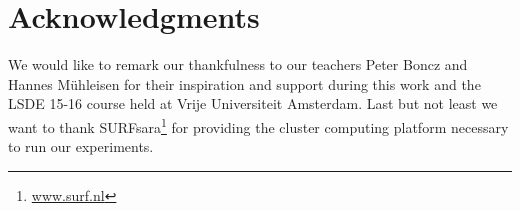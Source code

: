 \documentclass{vldb}
\begin{document}
\section{Acknowledgments}
We would like to remark our thankfulness to our teachers Peter Boncz and Hannes M{\"u}hleisen for their inspiration and support during this work and the LSDE 15-16 course held at Vrije Universiteit Amsterdam.
Last but not least we want to thank SURFsara\footnote{\url{www.surf.nl}} for providing the cluster computing platform necessary to run our experiments.


 

\end{document}
